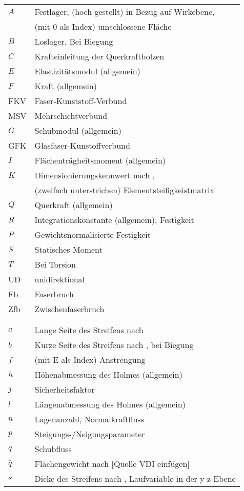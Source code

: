 \begin{longtable}{ll}
\onehalfspacing
$ A $&Festlager, (hoch gestellt) in Bezug auf Wirkebene,\\
&(mit 0 als Index) umschlossene Fläche\\
$ B $&Loslager, Bei Biegung\\
$ C $&Krafteinleitung der Querkraftbolzen\\
$ E $&Elastizitätsmodul (allgemein)\\
$ F $&Kraft (allgemein)\\
FKV&Faser-Kunststoff-Verbund\\
MSV&Mehrschichtverbund\\
$ G $&Schubmodul (allgemein)\\
GFK& Glasfaser-Kunstoffverbund\\
$ I $&Flächenträgheitsmoment (allgemein)\\
$ K $&Dimensionierungskennwert nach \cite{item5},\\
 &  (zweifach unterstrichen) Elementsteifigkeistmatrix\\
$ Q $&Querkraft (allgemein)\\
$ R $&Integrationskonstante (allgemein), Festigkeit\\
$ P $&Gewichtsnormalisierte Festigkeit\\
$ S $&Statisches Moment\\
$ T $&Bei Torsion\\
UD&unidirektional\\
Fb&Faserbruch\\
Zfb&Zwischenfaserbruch\\
& \\
& \\
$ a $&Lange Seite des Streifens nach \cite{item1}\\
$ b $&Kurze Seite des Streifens nach \cite{item1}, bei Biegung\\
$ f $&(mit E als Index) Anstrengung\\
$ h $&Höhenabmessung des Holmes (allgemein)\\
$ j $&Sicherheitsfaktor\\
$ l $&Längenabmessung des Holmes (allgemein)\\
$ n $&Lagenanzahl, Normalkraftfluss\\
$ p $&Steigungs-/Neigungsparameter\\
$ q $&Schubfluss\\
$ \bar{q} $&Flächengewicht nach [Quelle VDI einfügen]\\
$ s $&Dicke des Streifens nach \cite{item1}, Laufvariable in der	y-z-Ebene\\

\end{longtable}
